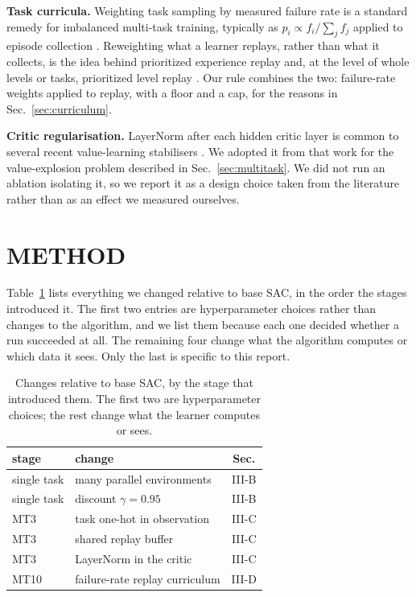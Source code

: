 \documentclass[letterpaper, 10 pt, conference]{ieeeconf}
\begin{document}
\textbf{Task curricula.} Weighting task sampling by measured failure rate is a standard
remedy for imbalanced multi-task training, typically as $p_i \propto f_i / \sum_j f_j$
applied to episode collection \cite{matiisen2020tscl}. Reweighting what a learner
replays, rather than what it collects, is the idea behind prioritized experience replay
\cite{schaul2016per} and, at the level of whole levels or tasks, prioritized level replay
\cite{jiang2021plr}. Our rule combines the two: failure-rate weights applied to replay, with
a floor and a cap, for the reasons in Sec.~\ref{sec:curriculum}.

\textbf{Critic regularisation.} LayerNorm after each hidden critic layer is common to
several recent value-learning stabilisers \cite{nauman2024bro,lee2025simba,bhatt2024crossq}.
We adopted it from that work for the value-explosion problem described in
Sec.~\ref{sec:multitask}. We did not run an ablation isolating it, so we report it as a
design choice taken from the literature rather than as an effect we measured ourselves.

\section{METHOD}
\label{sec:method}

Table~\ref{tab:mods} lists everything we changed relative to base SAC, in the order the
stages introduced it. The first two entries are hyperparameter choices rather than changes to
the algorithm, and we list them because each one decided whether a run succeeded at all. The
remaining four change what the algorithm computes or which data it sees. Only the last is
specific to this report.

\begin{table}[tb]
\caption{Changes relative to base SAC, by the stage that introduced them. The first two
are hyperparameter choices; the rest change what the learner computes or sees.}
\label{tab:mods}
\vspace{-0.2cm}
\begin{center}
\small
\begin{tabular}{llc}
\toprule
stage & change & Sec. \\
\midrule
single task & many parallel environments   & III-B \\
single task & discount $\gamma = 0.95$     & III-B \\
MT3         & task one-hot in observation  & III-C \\
MT3         & shared replay buffer         & III-C \\
MT3         & LayerNorm in the critic      & III-C \\
MT10        & failure-rate replay curriculum & III-D \\
\bottomrule
\end{tabular}
\vspace{-0.7cm}
\end{center}
\end{table}
\end{document}
